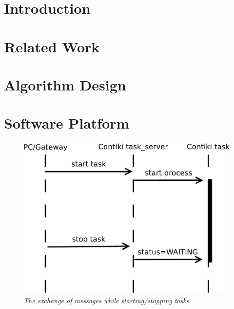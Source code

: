 \documentclass[11pt, oneside, a4paper, oldfontcommands]{memoir}
\begin{document}
\frontmatter


\mainmatter

\chapter{Introduction}

\chapter{Related Work}
\chapter{Algorithm Design}

\chapter{Software Platform}
\begin{figure}[ht]
 \begin{center}
  \includegraphics[scale=0.5]{img/starttask.pdf}
 \end{center}
 \caption{\small \itshape{The exchange of messages while starting/stopping tasks}}
\end{figure}
\end{document}

